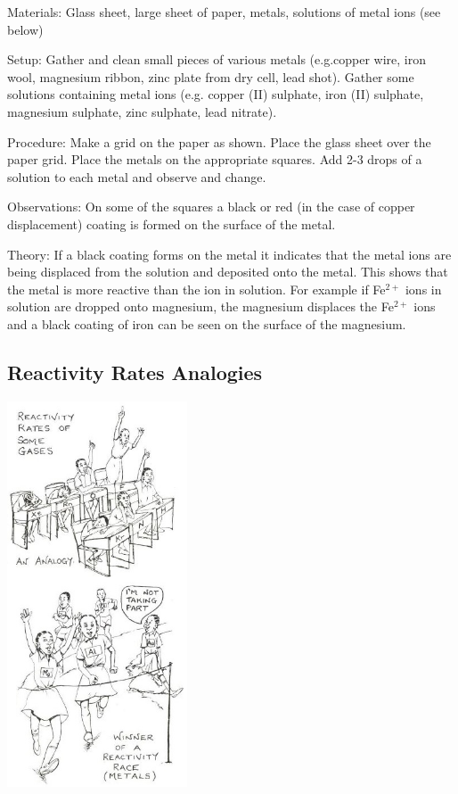\begin{multicols}{2}
\begin{description*}
\item[Materials:]{Glass sheet, large sheet of paper, metals, solutions of metal ions (see below)}
\item[Setup:]{Gather and clean small pieces of various metals (e.g.copper wire, iron wool, magnesium ribbon, zinc plate from dry cell, lead shot). Gather some solutions containing metal ions (e.g. copper (II) sulphate, iron (II) sulphate, magnesium sulphate, zinc sulphate, lead nitrate).}
\item[Procedure:]{Make a grid on the paper as shown. Place the glass sheet over the paper grid. Place the metals on the appropriate squares. Add 2-3 drops of a solution to each metal and observe and change.}
\item[Observations:]{On some of the squares a black or red (in the
case of copper displacement) coating is formed
on the surface of the metal.}
\item[Theory:]{If a black coating forms on the metal it indicates that the metal ions are being displaced from the solution and deposited onto the metal. This shows that the metal is more reactive than the ion in solution. For example if Fe$^{2+}$ ions in
solution are dropped onto magnesium, the
magnesium displaces the Fe$^{2+}$ ions and a black
coating of iron can be seen on the surface of the
magnesium.}
\end{description*}

\subsection{Reactivity Rates Analogies}

\begin{center}
\includegraphics[width=0.4\textwidth]{./img/source/reactivity-rates-cartoons.jpg}
\end{center}


\end{multicols}
